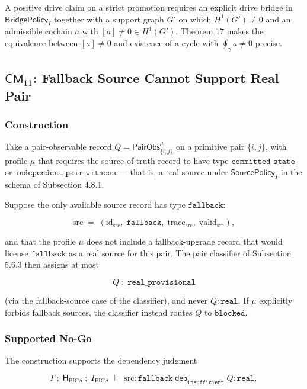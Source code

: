 \documentclass[11pt]{article}
\theoremstyle{definition}
\begin{document}
A positive drive claim on a strict promotion requires an explicit drive bridge in \(\mathsf{BridgePolicy}_I\) together with a support graph \(G'\) on which \(H^1(G')\neq 0\) and an admissible cochain \(a\) with \([a]\neq 0\in H^1(G')\). Theorem 17 makes the equivalence between \([a]\neq 0\) and existence of a cycle with \(\oint_\gamma a\neq 0\) precise.

\subsection{\texorpdfstring{\(\mathsf{CM}_{11}\): Fallback Source Cannot Support Real Pair}{C.12 \textbackslash mathsf\{CM\}\_\{11\}: Fallback Source Cannot Support Real Pair}}

\subsubsection{Construction}

Take a pair-observable record \(Q=\mathsf{PairObs}_{\{i,j\}}^{\mu}\) on a primitive pair \(\{i,j\}\), with profile \(\mu\) that requires the source-of-truth record to have type \(\texttt{committed\_state}\) or \(\texttt{independent\_pair\_witness}\) --- that is, a real source under \(\mathsf{SourcePolicy}_I\) in the schema of Subsection 4.8.1.

Suppose the only available source record has type \(\texttt{fallback}\):

\[
\mathrm{src}\;=\;(\mathrm{id}_{\mathrm{src}},\;\texttt{fallback},\;\mathrm{trace}_{\mathrm{src}},\;\mathrm{valid}_{\mathrm{src}}),
\]

and that the profile \(\mu\) does not include a fallback-upgrade record that would license \(\texttt{fallback}\) as a real source for this pair. The pair classifier of Subsection 5.6.3 then assigns at most

\[
Q\;:\;\texttt{real\_provisional}
\]

(via the fallback-source case of the classifier), and never \(Q:\texttt{real}\). If \(\mu\) explicitly forbids fallback sources, the classifier instead routes \(Q\) to \(\texttt{blocked}\).

\subsubsection{Supported No-Go}

The construction supports the dependency judgment

\[
\Gamma\,;\;\mathsf H_{\mathrm{PICA}}\,;\;I_{\mathrm{PICA}}\;\vdash\;\mathrm{src}:\texttt{fallback}\;\mathrel{\mathsf{dep}_{\texttt{insufficient}}}\;Q:\texttt{real},
\]
\end{document}
